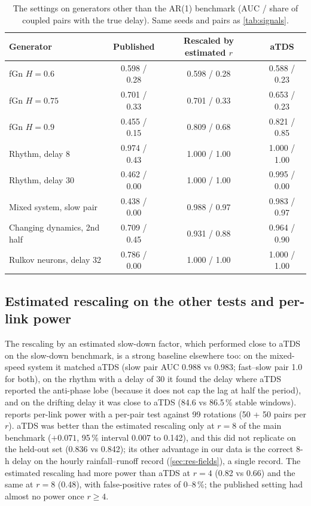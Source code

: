 \documentclass[11pt,a4paper]{article}
\begin{document}
\begin{table}[t]
\centering
\caption{The settings on generators other than the AR(1) benchmark (AUC / share of coupled pairs with the true delay). Same seeds and pairs as \cref{tab:signals}.}
\label{tab:generalise}
\footnotesize
\begin{tabular}{lccc}
\toprule
Generator & Published & Rescaled by estimated $r$ & aTDS \\
\midrule
fGn $H = 0.6$ & 0.598 / 0.28 & 0.598 / 0.28 & 0.588 / 0.23 \\
fGn $H = 0.75$ & 0.701 / 0.33 & 0.701 / 0.33 & 0.653 / 0.23 \\
fGn $H = 0.9$ & 0.455 / 0.15 & 0.809 / 0.68 & 0.821 / 0.85 \\
Rhythm, delay 8 & 0.974 / 0.43 & 1.000 / 1.00 & 1.000 / 1.00 \\
Rhythm, delay 30 & 0.462 / 0.00 & 1.000 / 1.00 & 0.995 / 0.00 \\
Mixed system, slow pair & 0.438 / 0.00 & 0.988 / 0.97 & 0.983 / 0.97 \\
Changing dynamics, 2nd half & 0.709 / 0.45 & 0.931 / 0.88 & 0.964 / 0.90 \\
Rulkov neurons, delay 32 & 0.786 / 0.00 & 1.000 / 1.00 & 1.000 / 1.00 \\
\bottomrule
\end{tabular}
\end{table}

\subsection{Estimated rescaling on the other tests and per-link power}
\label{sec:res-power}
The rescaling by an estimated slow-down factor, which performed close to aTDS on the slow-down benchmark, is a strong baseline elsewhere too: on the mixed-speed system it matched aTDS (slow pair AUC 0.988 vs 0.983; fast--slow pair 1.0 for both), on the rhythm with a delay of 30 it found the delay where aTDS reported the anti-phase lobe (because it does not cap the lag at half the period), and on the drifting delay it was close to aTDS (84.6 vs 86.5\,\% stable windows).  reports per-link power with a per-pair test against 99 rotations (50 + 50 pairs per $r$). aTDS was better than the estimated rescaling only at $r = 8$ of the main benchmark ($+0.071$, 95\,\% interval 0.007 to 0.142), and this did not replicate on the held-out set (0.836 vs 0.842); its other advantage in our data is the correct 8-h delay on the hourly rainfall--runoff record (\cref{sec:res-fields}), a single record. The estimated rescaling had more power than aTDS at $r = 4$ (0.82 vs 0.66) and the same at $r = 8$ (0.48), with false-positive rates of 0--8\,\%; the published setting had almost no power once $r \ge 4$.
\end{document}
